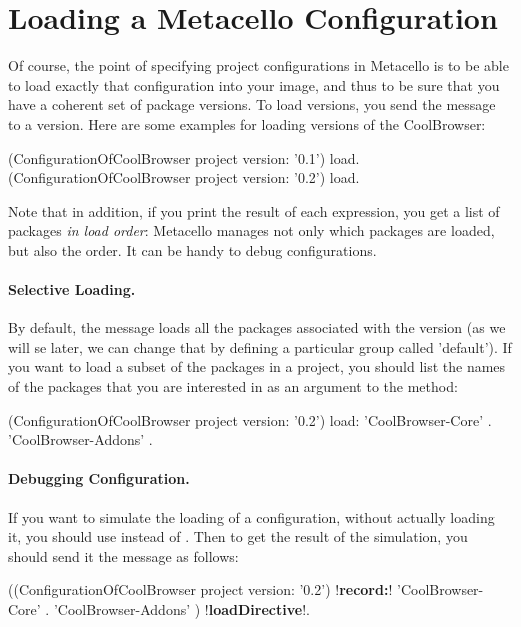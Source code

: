 \documentclass[a4paper,10pt,twoside]{book}
\begin{document}
\section{Loading a Metacello Configuration}
Of course, the point of specifying project configurations in Metacello is to be able to load exactly that configuration into your image, and thus to be sure that you have a coherent set of package versions. 
To load versions, you send the message  to a version. Here are some examples for loading versions of the CoolBrowser: 

\begin{code}{}
  (ConfigurationOfCoolBrowser project version: '0.1') load.
  (ConfigurationOfCoolBrowser project version: '0.2') load.
\end{code}

Note that in addition, if you print the result of each expression, you get a list of packages \emph{in load order}: Metacello manages not only which packages are loaded, but also the order. It can be handy to debug configurations.

\paragraph{Selective Loading.} By default, the  message loads all the packages associated with the version (as we will se later, we can change that by defining a particular group called 'default'). If you want to load a subset of the packages in a project, you should list 
the names of the packages that you are interested in as an argument to the  method:

\begin{code}{}
  (ConfigurationOfCoolBrowser project version: '0.2') load: 
  		{ 'CoolBrowser-Core' . 
  		'CoolBrowser-Addons' }.
\end{code}


\paragraph{Debugging Configuration.}

If you want to simulate the loading of a configuration, without actually loading it, you should use  instead of . Then to get the result of the simulation, you should send it the message  as follows:

\begin{code}{}
  ((ConfigurationOfCoolBrowser project version: '0.2') !\textbf{record:}! 
  		{ 'CoolBrowser-Core' .
		'CoolBrowser-Addons' }) !\textbf{loadDirective}!.
\end{code} 
\end{document}
